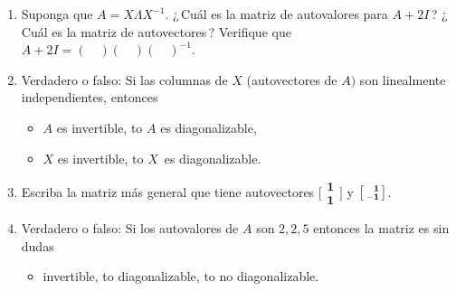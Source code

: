\documentclass[12pt,a4paper]{article}
\newcommand\1{\mbox{\,\vrule height-0.8pt depth1.0pt width2pc\,}}
\newcommand\2{\mbox{\,\vrule height-0.8pt depth1.0pt width1pc\,}}
\def\ph{\phantom{-}}
\newcommand{\bm}{\mathbf}
\def\hitem[#1]{\unskip\qquad\hbox to\standardindent{#1\hfil}\ignorespaces}
\begin{document}
\begin{enumerate}
\item Suponga que $A=X\Lambda X^{-1}$. ¿\,Cuál es la matriz de autovalores para $A+2I$\,? ¿\,Cuál es la matriz de autovectores\,? Verifique que  $A+2I=(\quad ) (\quad )(\quad )^{-1}$.

\item Verdadero o falso: Si las columnas de $X$ (autovectores de $A)$ son linealmente independientes, entonces
\begin{itemize}
  \settowidth{}
  \def\S{\leavevmode\hbox to\dima{\hfil$S$\hfil}}
\item[(a)] $A$ es invertible,
\hitem[(b)] $A$ es diagonalizable,
\item[(c)] $X$ es invertible,
\!\!\!\hitem[(d)] $X$\ es diagonalizable.
\end{itemize}

\item Escriba la matriz más general que tiene autovectores
  $\bigl[\begin{smallmatrix} \bm{1}\\
    \bm{1}\end{smallmatrix}\bigr]$ y $\bigl[\begin{smallmatrix}
    \ph \bm{1}\\ 
    \bold{-1}\end{smallmatrix}\bigr]$.

\item Verdadero o falso: Si los autovalores de $A$ son $2,2,5$ entonces la matriz es sin dudas
\begin{itemize}
\item[(a)] invertible,
\hitem[(b)] diagonalizable,
\hitem[(c)] no diagonalizable.
\end{itemize}


\end{enumerate}
\end{document}
